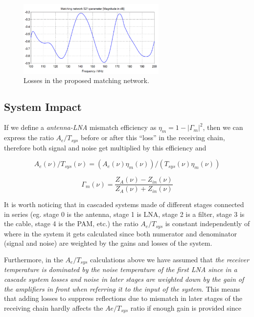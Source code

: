 \documentclass[11pt]{article}
\begin{document}
\begin{figure}[ht]
\centering
\includegraphics[width=0.65\textwidth]{S21_MN.png}
\caption{\small Losses in the proposed matching network.}
\label{Fig:S11_MN}
\end{figure}

\subsection{System Impact}
If we define a {\em antenna-LNA} mismatch efficiency as $\eta_m = 1-|\Gamma_{m}|^2$, then we can express the ratio $A_e/T_{sys}$ before or after this ``loss'' in the receiving chain, therefore both signal and noise get multiplied by this efficiency and

\begin{equation}
A_e(\nu)/T_{sys}(\nu) = (A_e(\nu)\eta_m(\nu))/(T_{sys}(\nu)\eta_m(\nu))
\end{equation}

\begin{equation}
\Gamma_{m}(\nu) = \frac{Z_A(\nu)-Z_{in}(\nu)}{Z_A(\nu)+Z_{in}(\nu)} 
\end{equation}

It is worth noticing that in cascaded systems made of different stages connected in series (eg. stage 0 is the antenna, stage 1 is LNA, stage 2 is a filter, stage 3 is the cable, stage 4 is the PAM, etc.) the ratio $A_e/T_{sys}$ is constant independently of where in the system it gets calculated since both numerator and denominator (signal and noise) are weighted by the gains and losses of the system.

Furthermore, in the $A_{e}/T_{sys}$ calculations above we have assumed that {\em the receiver temperature is dominated by the noise temperature of the first LNA since in a cascade system losses and noise in later stages are weighted down by the gain of the amplifiers in front when referring it to the input of the system}. This means that adding losses to suppress reflections due to mismatch in later stages of the receiving chain hardly affects the $Ae/T_{sys}$ ratio if enough gain is provided since
\end{document}
